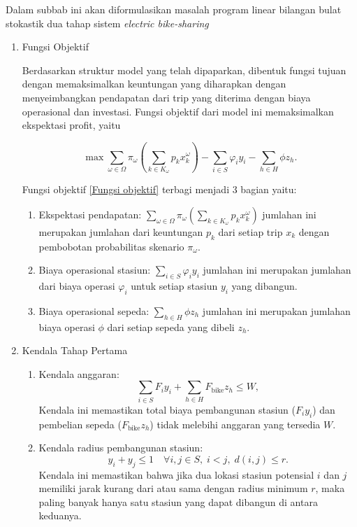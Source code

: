Dalam subbab ini akan diformulasikan masalah program linear bilangan bulat stokastik dua tahap sistem \textit{electric bike-sharing}

\begin{enumerate}
    \item Fungsi Objektif
    
    Berdasarkan struktur model yang telah dipaparkan, dibentuk fungsi tujuan dengan memaksimalkan keuntungan yang diharapkan dengan menyeimbangkan pendapatan dari trip yang diterima dengan biaya operasional dan investasi. Fungsi objektif dari model ini memaksimalkan ekspektasi profit, yaitu 
    
    \begin{equation}
        \max \sum_{\omega \in \Omega} \pi_{\omega} \left( \sum_{k \in K_{\omega}} p_k x_k^\omega \right) - \sum_{i \in S} \varphi_i y_i - \sum_{h \in H} \phi z_h.
        \label{Fungsi objektif}
    \end{equation}
    
    Fungsi objektif \eqref{Fungsi objektif} terbagi menjadi 3 bagian yaitu:
    \begin{enumerate}
        \item [a.] Ekspektasi pendapatan: $\sum_{\omega \in \Omega} \pi_{\omega} \left( \sum_{k \in K_{\omega}} p_k x_k^\omega \right)$ jumlahan ini merupakan jumlahan dari keuntungan $p_k$ dari setiap trip $x_k$ dengan pembobotan probabilitas skenario $\pi_\omega$.
        \item [b.] Biaya operasional stasiun: $\sum_{i \in S} \varphi_i y_i$ jumlahan ini merupakan jumlahan dari biaya operasi $\varphi_i$ untuk setiap stasiun $y_i$ yang dibangun.
        \item [c.] Biaya operasional sepeda: $\sum_{h \in H} \phi z_h$ jumlahan ini merupakan jumlahan biaya operasi $\phi$ dari setiap sepeda yang dibeli $z_h$.
    \end{enumerate}
    
    \item Kendala Tahap Pertama
    \begin{enumerate}
        \item [a.] Kendala anggaran:
        \begin{equation}
        \sum_{i \in S} F_i y_i + \sum_{h \in H} F_{\text{bike}} z_h \leq W,
        \end{equation}
        Kendala ini memastikan total biaya pembangunan stasiun ($F_i y_i$) dan pembelian sepeda ($F_{\text{bike}} z_h$) tidak melebihi anggaran yang tersedia $W$.\\
        \item [b.] Kendala radius pembangunan stasiun:
        \begin{equation}
        y_i + y_j \leq 1 \quad \forall i, j \in S, \; i < j, \; d(i, j) \leq r.
        \end{equation}
        Kendala ini memastikan bahwa jika dua lokasi stasiun potensial $i$ dan $j$ memiliki jarak kurang dari atau sama dengan radius minimum $r$, maka paling banyak hanya satu stasiun yang dapat dibangun di antara keduanya.\\
        \end{enumerate}
    

\end{enumerate}
